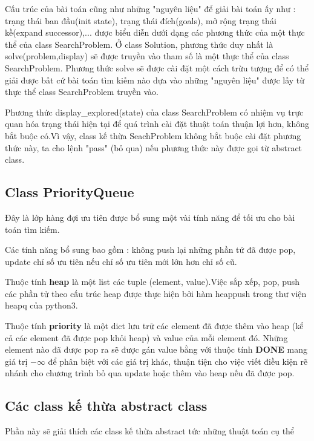 \documentclass[11pt]{scrartcl} %
\begin{document}
Cấu trúc của bài toán cũng như những "nguyên liệu" để giải bài toán ấy như : trạng thái ban đầu(init state), trạng thái đích(goals), mở rộng trạng thái kề(expand successor)\cite{csttnt_lhb},... được biểu diễn dưới dạng các phương thức của một thực thể của class SearchProblem. Ở class Solution, phương thức duy nhất là solve(problem,display) sẽ được truyền vào tham số là một thực thể của class SearchProblem. Phương thức solve sẽ được cài đặt một cách trừu tượng để có thể giải được bất cứ bài toán tìm kiếm nào dựa vào những "nguyên liệu" được lấy từ thực thể class SearchProblem truyền vào.

Phương thức display\_explored(state) của class SearchProblem có nhiệm vụ trực quan hóa trạng thái hiện tại để quá trình cài đặt thuật toán thuận lợi hơn, không bắt buộc có.Vì vậy, class kế thừa SeachProblem không bắt buộc cài đặt phương thức này, ta cho lệnh "pass" (bỏ qua) nếu phương thức này được gọi từ abstract class.

\subsection{Class PriorityQueue}
Đây là lớp hàng đợi ưu tiên được bổ sung một vài tính năng để tối ưu cho bài toán tìm kiếm.

Các tính năng bổ sung bao gồm : không push lại những phần tử đã được pop, update chỉ số ưu tiên nếu chỉ số ưu tiên mới lớn hơn chỉ số cũ. 


Thuộc tính \textbf{heap} là một list các tuple (element, value).Việc sắp xếp, pop, push các phần tử theo cấu trúc heap được thực hiện bởi hàm heappush trong thư viện heapq của python3.

Thuộc tính \textbf{priority} là một dict lưu trữ các element đã được thêm vào heap (kể cả các element đã được pop khỏi heap) và value của mỗi element đó. Những element nào đã được pop ra sẽ được gán value bằng với thuộc tính \textbf{DONE} mang giá trị $- \infty$ để phân biệt với các giá trị khác, thuận tiện cho việc viết điều kiện rẽ nhánh cho chương trình bỏ qua update hoặc thêm vào heap nếu đã được pop.
\subsection{Các class kế thừa abstract class}
Phần này sẽ giải thích các class kế thừa abstract tức những thuật toán cụ thể
\end{document}
